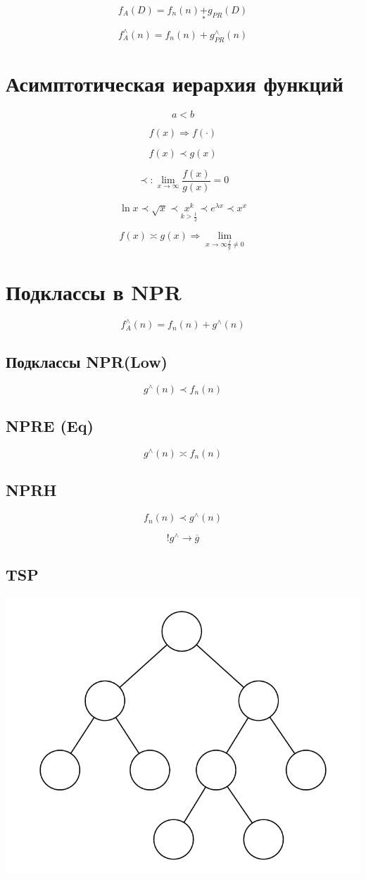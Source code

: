 \documentclass[a4paper, 14pt]{report}
\begin{document}
$$
f_A(D) = f_n(n) \underset{*}{+} g_{PR} (D)
$$

$$
f^\wedge_A(n) = f_n(n) + g^\wedge_{PR}(n)
$$


\section{Асимптотическая иерархия функций}

$$
a < b
$$

$$
f(x) \Rightarrow f(\cdot)
$$

$$
f(x) \prec g(x)
$$

$$
\prec : \lim_{x \to \infty} \frac{f(x)}{g(x)} = 0
$$

$$
\ln x \prec \sqrt{x} \prec \underset{k > \frac{1}{2}}{x^k} \prec e^{\lambda x}
\prec x^x
$$

$$
f(x) \asymp g(x) \Rightarrow \lim_{x \to \infty \frac{f}{g} \ne 0}
$$

\section{Подклассы в NPR}

$$
f_A^\wedge (n) = f_n(n) + g^\wedge (n)
$$

\subsection{Подклассы NPR(Low)}

$$
g^\wedge(n) \prec f_n(n)
$$

\subsection{NPRE (Eq)}

$$
g^\wedge (n) \asymp f_n(n)
$$

\subsection{NPRH}

$$
f_n(n) \prec g^\wedge (n)
$$

$$
!g^\wedge \to \overline{g}
$$

\subsection{TSP}

\begin{center}
    \includegraphics{anal2}
\end{center}
\end{document}
